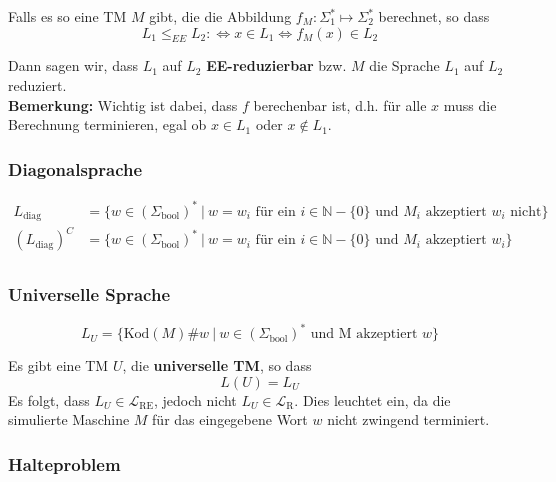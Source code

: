 \documentclass[11pt]{article}
\begin{document}
Falls es so eine TM $M$ gibt, die die Abbildung $f_M: \Sigma_1^*\mapsto\Sigma_2^*$ berechnet, so dass
\begin{equation*}
	L_1 \leq_{EE} L_2 :\Leftrightarrow x \in L_1 \Leftrightarrow f_M(x) \in L_2
\end{equation*}

Dann sagen wir, dass $L_1$ auf $L_2$ \textbf{EE-reduzierbar} bzw. $M$ die Sprache $L_1$ auf $L_2$ reduziert. \\

\textbf{Bemerkung:} Wichtig ist dabei, dass $f$ berechenbar ist, d.h. f{\"u}r alle $x$ muss die Berechnung terminieren, egal ob $x \in L_1$ oder $x \not\in L_1$.

\subsubsection{Diagonalsprache}

\begin{equation*}
\begin{split}
	L_\text{diag} &  = \{ w \in (\Sigma_\text{bool})^*\ |\ w = w_i \text{ f{\"u}r ein } i \in \mathbb{N} - \{0\} \text{ und $M_i$ akzeptiert $w_i$ nicht} \} \\
	(L_\text{diag})^C &  = \{ w \in (\Sigma_\text{bool})^*\ |\ w = w_i \text{ f{\"u}r ein } i \in \mathbb{N} - \{0\} \text{ und $M_i$ akzeptiert $w_i$} \} \\
\end{split}
\end{equation*}

\subsubsection{Universelle Sprache}

\begin{equation*}
	L_U = \{\text{Kod}(M)\#w\ |\ w \in (\Sigma_\text{bool})^* \text{ und M akzeptiert $w$}\}
\end{equation*}

Es gibt eine TM $U$, die \textbf{universelle TM}, so dass
\begin{equation*}
	L(U) = L_U
\end{equation*}
Es folgt, dass $L_U \in \mathcal{L}_\text{RE}$, jedoch nicht $L_U \in \mathcal{L}_\text{R}$. Dies leuchtet ein, da die simulierte Maschine $M$ f{\"u}r das eingegebene Wort $w$ nicht zwingend terminiert.

\subsubsection{Halteproblem}
\end{document}
